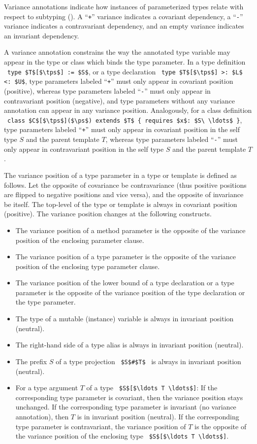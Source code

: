 Variance annotations indicate how instances of parameterized types relate with respect to subtyping (). A ``\lstinline!+!'' variance indicates a covariant dependency, a ``\lstinline!-!'' variance indicates a contravariant dependency, and an empty variance indicates an invariant dependency. 

A variance annotation constrains the way the annotated type variable may appear in the type or class which binds the type parameter. In a type definition ~\lstinline!type $T$[$\tps$] := $S$!, or a type declaration ~\lstinline!type $T$[$\tps$] >: $L$ <: $U$!, type parameters labeled ``\lstinline!+!'' must only appear in covariant position (positive), whereas type parameters labeled ``\lstinline!-!'' must only appear in contravariant position (negative), and type parameters without any variance annotation can appear in any variance position. Analogously, for a class definition ~\lstinline!class $C$[$\tps$]($\ps$) extends $T$ { requires $x$: $S\ \ldots$ }!, type parameters labeled ``\lstinline!+!'' must only appear in covariant position in the self type $S$ and the parent template $T$, whereas type parameters labeled ``\lstinline!-!'' must only appear in contravariant position in the self type $S$ and the parent template $T$.

The variance position of a type parameter in a type or template is defined as follows. Let the opposite of covariance be contravariance (thus positive positions are flipped to negative positions and vice versa), and the opposite of invariance be itself. The top-level of the type or template is always in covariant position (positive). The variance position changes at the following constructs. 
\begin{itemize}
  \item The variance position of a method parameter is the opposite of the variance position of the enclosing parameter clause. 
  \item The variance position of a type parameter is the opposite of the variance position of the enclosing type parameter clause. 
  \item The variance position of the lower bound of a type declaration or a type parameter is the opposite of the variance position of the type declaration or the type parameter. 
  \item The type of a mutable (instance) variable is always in invariant position (neutral). 
  \item The right-hand side of a type alias is always in invariant position (neutral). 
  \item The prefix $S$ of a type projection ~\lstinline!$S$#$T$!~ is always in invariant position (neutral). 
  \item For a type argument $T$ of a type ~\lstinline!$S$[$\ldots T \ldots$]!: If the corresponding type parameter is covariant, then the variance position stays unchanged. If the corresponding type parameter is invariant (no variance annotation), then $T$ is in invariant position (neutral). If the corresponding type parameter is contravariant, the variance position of $T$ is the opposite of the variance position of the enclosing type ~\lstinline!$S$[$\ldots T \ldots$]!. 
\end{itemize}

